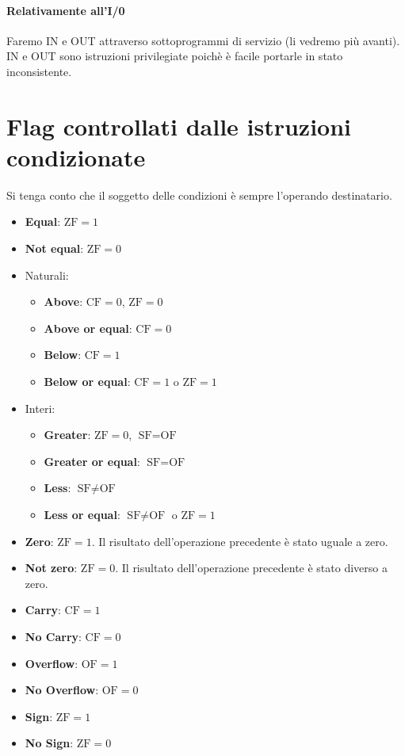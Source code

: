 \documentclass[11pt]{report}
\begin{document}
\paragraph{Relativamente all'I/0} Faremo IN e OUT attraverso sottoprogrammi di servizio (li vedremo più avanti). IN e OUT sono istruzioni privilegiate poichè è facile portarle in stato inconsistente.

\clearpage
\section{Flag controllati dalle istruzioni condizionate}
Si tenga conto che il soggetto delle condizioni è sempre l'operando destinatario.
\begin{itemize}
\item \textbf{Equal}: $\text{ZF}=1$
\item \textbf{Not equal}: $\text{ZF}=0$
\item Naturali:
\begin{itemize}
\item \textbf{Above}: $\text{CF}=0$, $\text{ZF}=0$
\item \textbf{Above or equal}: $\text{CF}=0$
\item \textbf{Below}: $\text{CF}=1$
\item \textbf{Below or equal}: $\text{CF}=1$ o $\text{ZF}=1$
\end{itemize}
\item Interi:
\begin{itemize}
\item \textbf{Greater}: $\text{ZF}=0$, $\text{SF}=\text{OF}$
\item \textbf{Greater or equal}: $\text{SF}=\text{OF}$
\item \textbf{Less}: $\text{SF} \neq \text{OF}$
\item \textbf{Less or equal}:  $\text{SF} \neq \text{OF}$ o  $\text{ZF}=1$
\end{itemize}
\item \textbf{Zero}: $\text{ZF}=1$. Il risultato dell'operazione precedente è stato uguale a zero.
\item \textbf{Not zero}: $\text{ZF}=0$. Il risultato dell'operazione precedente è stato diverso a zero.
\item \textbf{Carry}: $\text{CF}=1$
\item \textbf{No Carry}: $\text{CF}=0$
\item \textbf{Overflow}: $\text{OF}=1$
\item \textbf{No Overflow}: $\text{OF}=0$
\item \textbf{Sign}: $\text{ZF}=1$
\item \textbf{No Sign}: $\text{ZF}=0$
\end{itemize}
\end{document}
